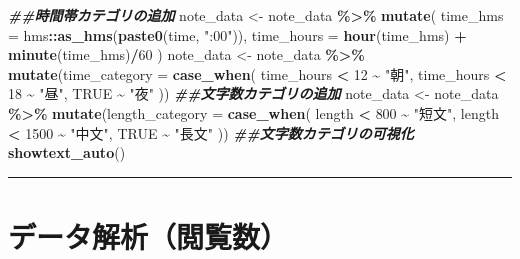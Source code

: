 \documentclass[
]{article}
\newenvironment{Shaded}{\begin{snugshade}}{\end{snugshade}}
\newcommand{\AttributeTok}[1]{\textcolor[rgb]{0.13,0.29,0.53}{#1}}
\newcommand{\ConstantTok}[1]{\textcolor[rgb]{0.56,0.35,0.01}{#1}}
\newcommand{\DecValTok}[1]{\textcolor[rgb]{0.00,0.00,0.81}{#1}}
\newcommand{\DocumentationTok}[1]{\textcolor[rgb]{0.56,0.35,0.01}{\textbf{\textit{#1}}}}
\newcommand{\FunctionTok}[1]{\textcolor[rgb]{0.13,0.29,0.53}{\textbf{#1}}}
\newcommand{\NormalTok}[1]{#1}
\newcommand{\OtherTok}[1]{\textcolor[rgb]{0.56,0.35,0.01}{#1}}
\newcommand{\SpecialCharTok}[1]{\textcolor[rgb]{0.81,0.36,0.00}{\textbf{#1}}}
\newcommand{\StringTok}[1]{\textcolor[rgb]{0.31,0.60,0.02}{#1}}
\begin{document}
\begin{Shaded}
\begin{Highlighting}[]
\DocumentationTok{\#\#時間帯カテゴリの追加}
\NormalTok{note\_data }\OtherTok{\textless{}{-}}\NormalTok{ note\_data }\SpecialCharTok{\%\textgreater{}\%}
  \FunctionTok{mutate}\NormalTok{(}
    \AttributeTok{time\_hms =}\NormalTok{ hms}\SpecialCharTok{::}\FunctionTok{as\_hms}\NormalTok{(}\FunctionTok{paste0}\NormalTok{(time, }\StringTok{":00"}\NormalTok{)),}
    \AttributeTok{time\_hours =} \FunctionTok{hour}\NormalTok{(time\_hms) }\SpecialCharTok{+} \FunctionTok{minute}\NormalTok{(time\_hms)}\SpecialCharTok{/}\DecValTok{60}
\NormalTok{  )}
\NormalTok{note\_data }\OtherTok{\textless{}{-}}\NormalTok{ note\_data }\SpecialCharTok{\%\textgreater{}\%}
  \FunctionTok{mutate}\NormalTok{(}\AttributeTok{time\_category =} \FunctionTok{case\_when}\NormalTok{(}
\NormalTok{    time\_hours }\SpecialCharTok{\textless{}} \DecValTok{12} \SpecialCharTok{\textasciitilde{}} \StringTok{"朝"}\NormalTok{,}
\NormalTok{    time\_hours }\SpecialCharTok{\textless{}} \DecValTok{18} \SpecialCharTok{\textasciitilde{}} \StringTok{"昼"}\NormalTok{,}
    \ConstantTok{TRUE} \SpecialCharTok{\textasciitilde{}} \StringTok{"夜"}
\NormalTok{  ))}
\DocumentationTok{\#\#文字数カテゴリの追加}
\NormalTok{note\_data }\OtherTok{\textless{}{-}}\NormalTok{ note\_data }\SpecialCharTok{\%\textgreater{}\%}
  \FunctionTok{mutate}\NormalTok{(}\AttributeTok{length\_category =} \FunctionTok{case\_when}\NormalTok{(}
\NormalTok{    length }\SpecialCharTok{\textless{}} \DecValTok{800} \SpecialCharTok{\textasciitilde{}} \StringTok{"短文"}\NormalTok{,}
\NormalTok{    length }\SpecialCharTok{\textless{}} \DecValTok{1500} \SpecialCharTok{\textasciitilde{}} \StringTok{"中文"}\NormalTok{,}
    \ConstantTok{TRUE} \SpecialCharTok{\textasciitilde{}} \StringTok{"長文"}
\NormalTok{  ))}
\DocumentationTok{\#\#文字数カテゴリの可視化}
\FunctionTok{showtext\_auto}\NormalTok{()}
\end{Highlighting}
\end{Shaded}

\begin{center}\rule{0.5\linewidth}{0.5pt}\end{center}

\section{データ解析（閲覧数）}\label{ux30c7ux30fcux30bfux89e3ux6790ux95b2ux89a7ux6570}
\end{document}
